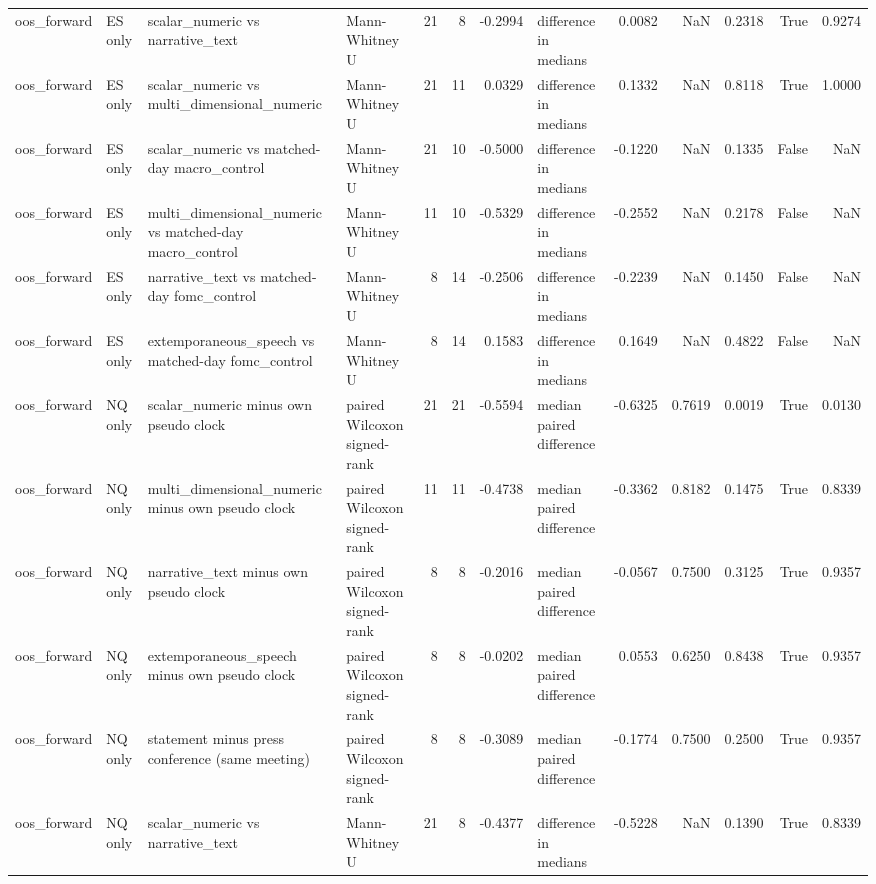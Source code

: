 \begin{tabular}{llllrrrlrrrrr}
oos_forward & ES only & scalar_numeric vs narrative_text & Mann-Whitney U & 21 & 8 & -0.2994 & difference in medians & 0.0082 & NaN & 0.2318 & True & 0.9274 \\
oos_forward & ES only & scalar_numeric vs multi_dimensional_numeric & Mann-Whitney U & 21 & 11 & 0.0329 & difference in medians & 0.1332 & NaN & 0.8118 & True & 1.0000 \\
oos_forward & ES only & scalar_numeric vs matched-day macro_control & Mann-Whitney U & 21 & 10 & -0.5000 & difference in medians & -0.1220 & NaN & 0.1335 & False & NaN \\
oos_forward & ES only & multi_dimensional_numeric vs matched-day macro_control & Mann-Whitney U & 11 & 10 & -0.5329 & difference in medians & -0.2552 & NaN & 0.2178 & False & NaN \\
oos_forward & ES only & narrative_text vs matched-day fomc_control & Mann-Whitney U & 8 & 14 & -0.2506 & difference in medians & -0.2239 & NaN & 0.1450 & False & NaN \\
oos_forward & ES only & extemporaneous_speech vs matched-day fomc_control & Mann-Whitney U & 8 & 14 & 0.1583 & difference in medians & 0.1649 & NaN & 0.4822 & False & NaN \\
oos_forward & NQ only & scalar_numeric minus own pseudo clock & paired Wilcoxon signed-rank & 21 & 21 & -0.5594 & median paired difference & -0.6325 & 0.7619 & 0.0019 & True & 0.0130 \\
oos_forward & NQ only & multi_dimensional_numeric minus own pseudo clock & paired Wilcoxon signed-rank & 11 & 11 & -0.4738 & median paired difference & -0.3362 & 0.8182 & 0.1475 & True & 0.8339 \\
oos_forward & NQ only & narrative_text minus own pseudo clock & paired Wilcoxon signed-rank & 8 & 8 & -0.2016 & median paired difference & -0.0567 & 0.7500 & 0.3125 & True & 0.9357 \\
oos_forward & NQ only & extemporaneous_speech minus own pseudo clock & paired Wilcoxon signed-rank & 8 & 8 & -0.0202 & median paired difference & 0.0553 & 0.6250 & 0.8438 & True & 0.9357 \\
oos_forward & NQ only & statement minus press conference (same meeting) & paired Wilcoxon signed-rank & 8 & 8 & -0.3089 & median paired difference & -0.1774 & 0.7500 & 0.2500 & True & 0.9357 \\
oos_forward & NQ only & scalar_numeric vs narrative_text & Mann-Whitney U & 21 & 8 & -0.4377 & difference in medians & -0.5228 & NaN & 0.1390 & True & 0.8339 \\

\end{tabular}
